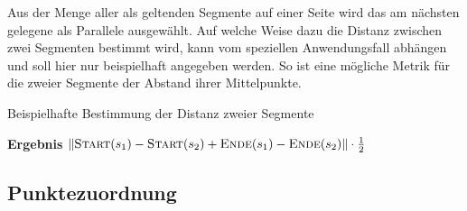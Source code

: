 \documentclass[../main/thesis.tex]{subfiles}
\begin{document}

Aus der Menge aller als  geltenden Segmente auf einer Seite wird das am nächsten gelegene als Parallele ausgewählt.
Auf welche Weise dazu die Distanz zwischen zwei Segmenten bestimmt wird, kann vom speziellen Anwendungsfall abhängen und soll hier nur beispielhaft angegeben werden.
So ist eine mögliche Metrik für die  zweier Segmente der Abstand ihrer Mittelpunkte.


\begin{algorithmhere}{Beispielhafte Bestimmung der Distanz zweier Segmente}
\label{alg:Distanz}
\begin{algorithmic}
	\State \textbf{Ergebnis} $\abs\textproc{Start}(s_1) - \textproc{Start}(s_2) + \textproc{Ende}(s_1) - \textproc{Ende}(s_2)\abs \cdot \frac{1}{2}$
\EndFunction
\end{algorithmic}
\end{algorithmhere}




\subsection{Punktezuordnung}
\label{ch:node-match-algorithm}

%
%
\end{document}
